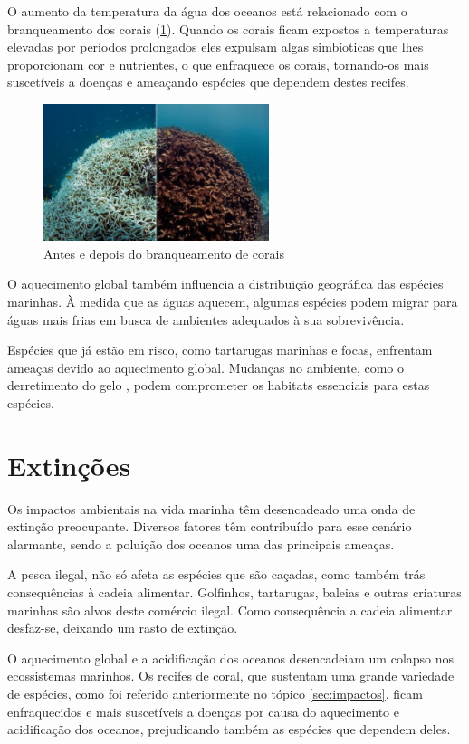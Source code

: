 \documentclass{report}
\begin{document}
O aumento da temperatura da água dos oceanos está relacionado com o branqueamento dos corais (\ref{fig:branqueamento}). Quando os corais ficam expostos a temperaturas elevadas por períodos prolongados eles expulsam algas simbíoticas que lhes proporcionam cor e nutrientes, o que enfraquece os corais, tornando-os mais suscetíveis a doenças e ameaçando espécies que dependem destes recifes.

\begin{figure}[H]
    \center
        \includegraphics[height=4cm]{imagens/antes_e_depois.jpg}
        \caption{Antes e depois do branqueamento de corais}
        \label{fig:branqueamento}
\end{figure}

O aquecimento global também influencia a distribuição geográfica das espécies marinhas. À medida que as águas aquecem, algumas espécies podem migrar para águas mais frias em busca de ambientes adequados à sua sobrevivência.

Espécies que já estão em risco, como tartarugas marinhas e focas, enfrentam ameaças devido ao aquecimento global. Mudanças no ambiente, como o derretimento do gelo , podem comprometer os habitats essenciais para estas espécies.


\section{Extinções}
\label{extincoes}
Os impactos ambientais na vida marinha têm desencadeado uma onda de extinção preocupante. Diversos fatores têm contribuído para esse cenário alarmante, sendo a poluição dos oceanos uma das principais ameaças. 

A pesca ilegal, não só afeta as espécies que são caçadas, como também trás consequências à cadeia alimentar. Golfinhos, tartarugas, baleias e outras criaturas marinhas são alvos deste comércio ilegal. Como consequência a cadeia alimentar desfaz-se, deixando um rasto de extinção.

O aquecimento global e a acidificação dos oceanos desencadeiam um colapso nos ecossistemas marinhos. Os recifes de coral, que sustentam uma grande variedade de espécies, como foi referido anteriormente no tópico \ref{sec:impactos}, ficam enfraquecidos e mais suscetíveis a doenças por causa do aquecimento e acidificação dos oceanos, prejudicando também as espécies que dependem deles.
\end{document}
